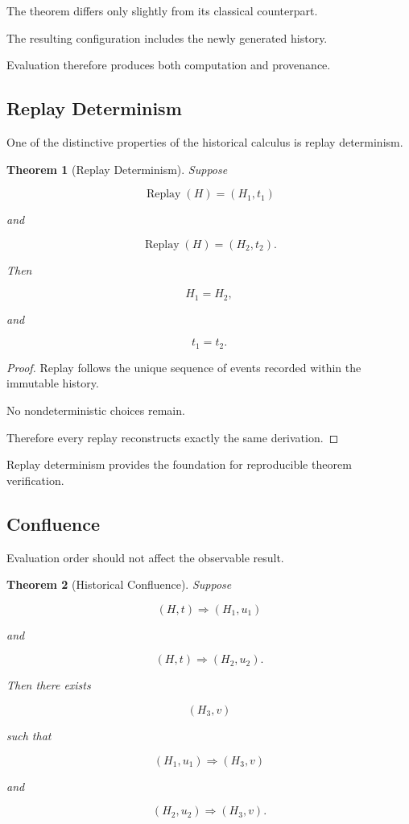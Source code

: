 \documentclass[12pt,oneside]{article}
\newtheorem{theorem}{Theorem}[section]
\theoremstyle{definition}
\theoremstyle{remark}
\DeclareMathOperator{\Replay}{Replay}
\begin{document}
The theorem differs only slightly from its classical counterpart.

The resulting configuration includes the newly generated history.

Evaluation therefore produces both computation and provenance.

\subsection{Replay Determinism}

One of the distinctive properties of the historical calculus is replay
determinism.

\begin{theorem}[Replay Determinism]

Suppose

\[
\Replay(H)
=
(H_1,t_1)
\]

and

\[
\Replay(H)
=
(H_2,t_2).
\]

Then

\[
H_1
=
H_2,
\]

and

\[
t_1
=
t_2.
\]

\end{theorem}

\begin{proof}

Replay follows the unique sequence of events recorded within the immutable
history.

No nondeterministic choices remain.

Therefore every replay reconstructs exactly the same derivation.

\end{proof}

Replay determinism provides the foundation for reproducible theorem
verification.

\subsection{Confluence}

Evaluation order should not affect the observable result.

\begin{theorem}[Historical Confluence]

Suppose

\[
(H,t)
\Longrightarrow
(H_1,u_1)
\]

and

\[
(H,t)
\Longrightarrow
(H_2,u_2).
\]

Then there exists

\[
(H_3,v)
\]

such that

\[
(H_1,u_1)
\Longrightarrow
(H_3,v)
\]

and

\[
(H_2,u_2)
\Longrightarrow
(H_3,v).
\]

\end{theorem}
\end{document}
